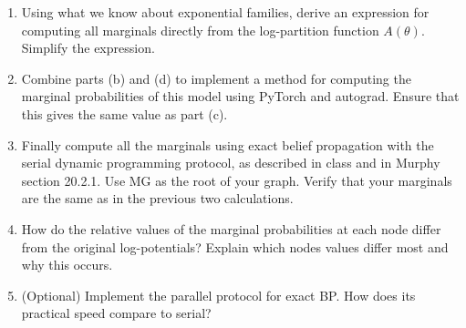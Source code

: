 \documentclass[10pt]{harvardml}
\theoremstyle{plain}
\begin{document}
\begin{problem}[30pts]
\begin{enumerate}[label=(\alph*)]
\item Using what we know about exponential families, derive an
  expression for computing all marginals directly from the
  log-partition function $A(\theta)$. Simplify the expression.

\item Combine parts (b) and (d) to implement a method for computing
  the marginal probabilities of this model using PyTorch and
  autograd. Ensure that this gives the same value as part (c).

\item Finally compute all the marginals using exact belief propagation
  with the serial dynamic programming protocol, as described in class
  and in Murphy section 20.2.1. Use MG as the root of your graph.
  Verify that your marginals are the same as in the previous two
  calculations.

\item How do the relative values of the marginal probabilities at each
  node differ from the original log-potentials?  Explain which nodes
  values differ most and why this occurs.


\item (Optional) Implement the parallel protocol for exact BP. How does its practical speed compare to
  serial?
\end{enumerate}
\end{problem}
\end{document}
